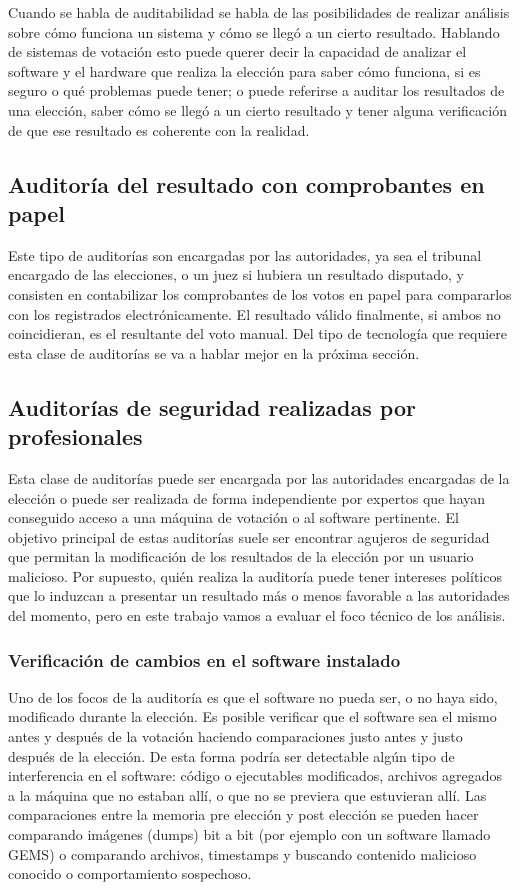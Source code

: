 Cuando se habla de auditabilidad se habla de las posibilidades de realizar análisis sobre cómo funciona un sistema y cómo se llegó a un cierto resultado. Hablando de sistemas de votación esto puede querer decir la capacidad de analizar el software y el hardware que realiza la elección para saber cómo funciona, si es seguro o qué problemas puede tener; o puede referirse a auditar los resultados de una elección, saber cómo se llegó a un cierto resultado y tener alguna verificación de que ese resultado es coherente con la realidad.

\subsection{Auditoría del resultado con comprobantes en papel}

Este tipo de auditorías son encargadas por las autoridades, ya sea el tribunal encargado de las elecciones, o un juez si hubiera un resultado disputado, y consisten en contabilizar los comprobantes de los votos en papel para compararlos con los registrados electrónicamente\cite{postElection}. El resultado válido finalmente, si ambos no coincidieran, es el resultante del voto manual. Del tipo de tecnología que requiere esta clase de auditorías se va a hablar mejor en la próxima sección.

\subsection{Auditorías de seguridad realizadas por profesionales}

Esta clase de auditorías puede ser encargada por las autoridades encargadas de la elección o puede ser realizada de forma independiente por expertos que hayan conseguido acceso a una máquina de votación o al software pertinente. El objetivo principal de estas auditorías suele ser encontrar agujeros de seguridad que permitan la modificación de los resultados de la elección por un usuario malicioso. Por supuesto, quién realiza la auditoría puede tener intereses políticos que lo induzcan a presentar un resultado más o menos favorable a las autoridades del momento, pero en este trabajo vamos a evaluar el foco técnico de los análisis.

\subsubsection{Verificación de cambios en el software instalado}

Uno de los focos de la auditoría es que el software no pueda ser, o no haya sido, modificado durante la elección. Es posible verificar que el software sea el mismo antes y después de la votación haciendo comparaciones justo antes y justo después de la elección. De esta forma podría ser detectable algún tipo de interferencia en el software: código o ejecutables modificados, archivos agregados a la máquina que no estaban allí, o que no se previera que estuvieran allí. Las comparaciones entre la memoria pre elección y post elección se pueden hacer comparando imágenes (dumps) bit a bit (por ejemplo con un software llamado GEMS) o comparando archivos, timestamps y buscando contenido malicioso conocido o comportamiento sospechoso.

